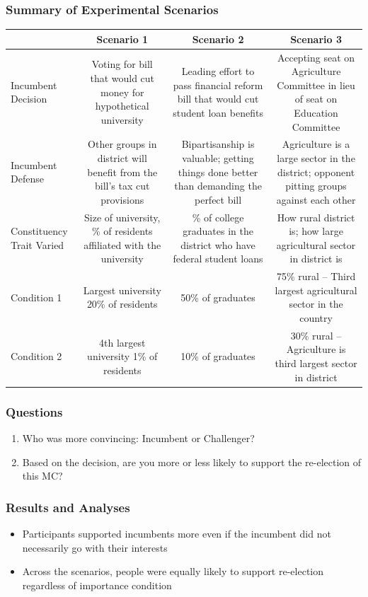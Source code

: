 \documentclass[14pt]{beamer}
\newcommand\tb{\textbf}
\begin{document}
\begin{frame}
\frametitle{Summary of Experimental Scenarios}
\tiny
\begin{table}
	\centering
	\def\arraystretch{1.5}
	\begin{tabulary}{\linewidth}{lCCC}
	\\
	\hline
	&\tb{Scenario 1}&\tb{Scenario 2}&\tb{Scenario 3}\\
	\hline
	Incumbent Decision&Voting for bill that would cut money for hypothetical university&Leading effort to pass financial reform bill that would cut student loan benefits&Accepting seat on Agriculture Committee in lieu of seat on Education Committee\\
	\hline
	Incumbent Defense&Other groups in district will benefit from the bill’s tax cut provisions&Bipartisanship is valuable; getting things done better than demanding the perfect bill&Agriculture is a large sector in the district; opponent pitting groups against each other\\
	\hline
	Constituency Trait Varied&Size of university, 
	\% of residents affiliated with the university&\% of college graduates in the district who have federal student loans&How rural district is; how large agricultural sector in district is\\
	\hline
	Condition 1&Largest university
	20\% of residents&50\% of graduates&75\% rural --
	Third largest agricultural sector in the country
\\
	\hline
	Condition 2&4th largest university
	1\% of residents&10\% of graduates&30\% rural
-- Agriculture is third largest sector in district
\\
	\hline
	\end{tabulary}
\end{table}
\end{frame}

\begin{frame}
\frametitle{Questions}
\begin{enumerate}
	\item Who was more convincing: Incumbent or Challenger?
	\item Based on the decision, are you more or less likely to support the re-election of this MC?
\end{enumerate}
\end{frame}

\begin{frame}
\frametitle{Results and Analyses}
\begin{itemize}
	\item Participants supported incumbents more even if the incumbent did not necessarily go with their interests
	\item Across the scenarios, people were equally likely to support re-election regardless of importance condition
\end{itemize}
\end{frame}
\end{document}
